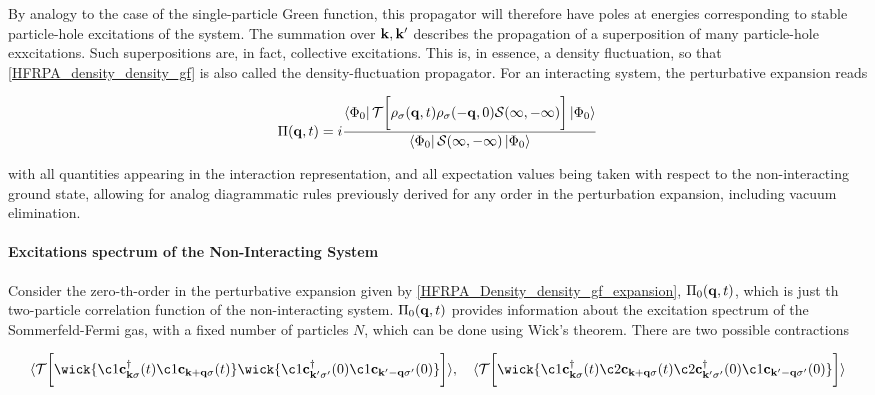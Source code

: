 By analogy to the case of the single-particle Green function, this propagator will therefore have poles at energies corresponding to stable particle-hole excitations of the system. The summation over ${\bf k}, {\bf k'}$ describes the propagation of a superposition of many particle-hole exxcitations. Such superpositions are, in fact, collective excitations. This is, in essence, a density fluctuation, so that \cref{HFRPA_density_density_gf} is also called the density-fluctuation propagator. For an interacting system, the perturbative expansion reads

\begin{equation}
    \Pi({\bf q},t) = i \frac{\bra{\Phi_0} \mathcal{T} \bigg[ \rho_{\sigma}({\bf q},t) \rho_{\sigma}(-{\bf q},0)\mathcal{S}(\infty, -\infty) \bigg] \ket{\Phi_0}}{\bra{\Phi_0} \mathcal{S}(\infty, -\infty) \ket{\Phi_0}}
    \label{HFRPA_Density_density_gf_expansion}
\end{equation}

with all quantities appearing in the interaction representation, and all expectation values being taken with respect to the non-interacting ground state, allowing for analog diagrammatic rules previously derived for any order in the perturbation expansion, including vacuum elimination. \\

\paragraph{Excitations spectrum of the Non-Interacting System}

Consider the zero-th-order in the perturbative expansion given by \cref{HFRPA_Density_density_gf_expansion}, $\Pi_0({\bf q}, t)$, which is just th two-particle correlation function of the non-interacting system. $\Pi_0({\bf q}, t)$ provides information about the excitation spectrum of the Sommerfeld-Fermi gas, with a fixed number of particles $N$, which can be done using Wick's theorem. There are two possible contractions 

\begin{align}
    \langle \mathcal{T} \bigg[\wick{ \c1 {\bf c}_{{\bf k}\sigma}^\dagger(t) \c1 {\bf c}_{{{\bf k+q}\sigma}}(t)} \wick{\c1 {\bf c}^\dagger_{{\bf k'}\sigma'}(0) \c1 {\bf c}_{{\bf k'-q}\sigma'}(0) } \bigg] \rangle, \quad \langle \mathcal{T} \bigg[\wick{ \c1 {\bf c}_{{\bf k}\sigma}^\dagger(t) \c2 {\bf c}_{{{\bf k+q}\sigma}}(t) \c2 {\bf c}^\dagger_{{\bf k'}\sigma'}(0) \c1 {\bf c}_{{\bf k'-q}\sigma'}(0) }\bigg] \rangle
\end{align}

